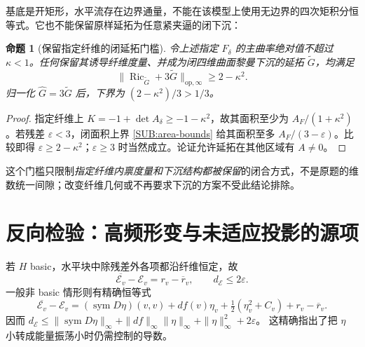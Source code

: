 \documentclass[UTF8,fontset=fandol,zihao=-4,oneside,openany]{ctexbook}
\theoremstyle{cjkplain}
\newtheorem{proposition}[theorem]{命题}
\numberwithin{equation}{chapter}
\begin{document}
基底是开矩形，水平流存在边界通量，不能在该模型上使用无边界的四次矩积分恒等式。它也不能保留原样延拓为任意紧夹逼的闭下沉：

\begin{proposition}[保留指定纤维的闭延拓门槛]\label{SUB:extension-gap}
令上述指定 $F_\delta$ 的主曲率绝对值不超过 $\kappa<1$。任何保留其诱导纤维度量、并成为闭四维曲面黎曼下沉的延拓 $\widetilde G$，均满足
\begin{equation}\label{SUB:extension-bound}
\|\operatorname{Ric}_{\widetilde G}+3\widetilde G\|_{\mathrm{op},\infty}
\ge2-\kappa^2.
\end{equation}
归一化 $\widehat G=3\widetilde G$ 后，下界为 $(2-\kappa^2)/3>1/3$。
\end{proposition}
\begin{proof}
指定纤维上 $K=-1+\det A_\delta\ge-1-\kappa^2$，故其面积至少为
$A_F/(1+\kappa^2)$。若残差 $\varepsilon<3$，闭面积上界 \eqref{SUB:area-bounds} 给其面积至多 $A_F/(3-\varepsilon)$。比较即得 $\varepsilon\ge2-\kappa^2$；$\varepsilon\ge3$ 时当然成立。论证允许延拓在其他区域有 $A\ne0$。
\end{proof}

这个门槛只限制\emph{指定纤维内禀度量和下沉结构都被保留}的闭合方式，不是原题的维数统一间隙；改变纤维几何或不再要求下沉的方案不受此结论排除。

\section{反向检验：高频形变与未适应投影的源项}

若 $H$ basic，水平块中除残差外各项都沿纤维恒定，故
\begin{equation}\label{SUB:basic-energy}
\overline{\mathcal E_v}-\mathcal E_v=r_v-\overline r_v,
\qquad d_{\mathcal E}\le2\varepsilon.
\end{equation}
一般非 basic 情形则有精确恒等式
\[
\overline{\mathcal E_v}-\mathcal E_v
=(\operatorname{sym}D\eta)(v,v)+df(v)\eta_v
+\tfrac12(\eta_v^2+C_v)+r_v-\overline r_v.
\]
因而
$d_{\mathcal E}\le\|\operatorname{sym}D\eta\|_\infty+
\|df\|_\infty\|\eta\|_\infty+\|\eta\|_\infty^2+2\varepsilon$。
这精确指出了把 $\eta$ 小转成能量振荡小时仍需控制的导数。
\end{document}

